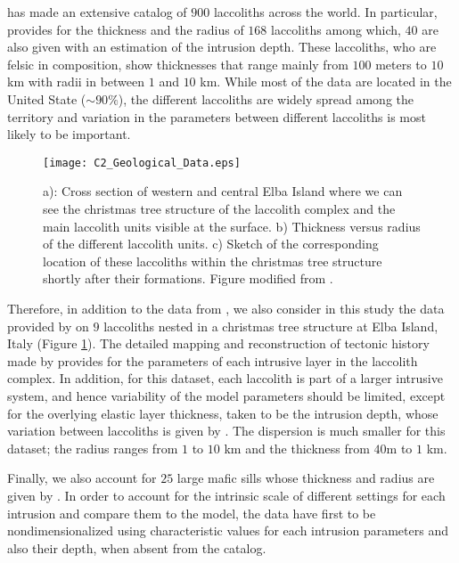 \citet{E:2015tl}  has made  an extensive  catalog of  $900$ laccoliths
across the  world.  In  particular, \citet{E:2015tl} provides  for the
thickness and  the radius  of $168$ laccoliths  among which,  $40$ are
also  given  with  an  estimation   of  the  intrusion  depth.   These
laccoliths, who are felsic in composition, show thicknesses that range
mainly from $100$ meters to $10$ km with radii in between $1$ and $10$
km.   While  most  of  the  data  are  located  in  the  United  State
($\sim 90\%$),  the different laccoliths  are widely spread  among the
territory and variation in the parameters between different laccoliths
is most likely to be important.
\begin{figure}[h!]
  \begin{center}
    \graphicspath{ {/Users/thorey/Documents/These/Manuscript/Figure/Chapter2/} }
    \texttt{[image: C2\_Geological\_Data.eps]}
    \caption{a):  Cross section  of  western and  central Elba  Island
      where we can  see the christmas tree structure  of the laccolith
      complex and the main laccolith  units visible at the surface. b)
      Thickness  versus radius  of the  different laccolith  units. c)
      Sketch of the corresponding  location of these laccoliths within
      the    christmas   tree    structure    shortly   after    their
      formations. Figure modified from \citet{Rocchi:2002jy}.}
    \label{C2_Geological_Data}
  \end{center}
\end{figure}

Therefore,  in addition  to the  data from  \citet{E:2015tl}, we  also
consider in this  study the data provided  by \citet{Rocchi:2002jy} on
$9$ laccoliths  nested in a  christmas tree structure at  Elba Island,
Italy  (Figure \ref{C2_Geological_Data}).   The  detailed mapping  and
reconstruction  of  tectonic  history  made  by  \citet{Rocchi:2002jy}
provides for the  parameters of each intrusive layer  in the laccolith
complex. In  addition, for this dataset,  each laccolith is part  of a
larger intrusive system, and hence variability of the model parameters
should be limited,  except for the overlying  elastic layer thickness,
taken to be the intrusion depth, whose variation between laccoliths is
given by  \citet{Rocchi:2002jy}.  The  dispersion is much  smaller for
this dataset; the radius ranges from  $1$ to $10$ km and the thickness
from $40$m to $1$ km.

Finally, we  also account for  $25$ large mafic sills  whose thickness
and radius are given by \citet{Cruden:tg}. In order to account for the
intrinsic scale of  different settings for each  intrusion and compare
them to the model, the data  have first to be nondimensionalized using
characteristic  values for  each intrusion  parameters and  also their
depth, when absent from the catalog.

